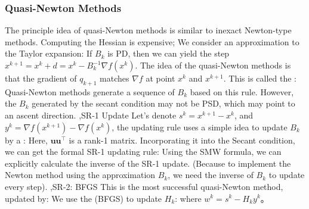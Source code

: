 \documentclass[10pt]{report}
\begin{document}
\subsubsection{Quasi-Newton Methods}
The principle idea of quasi-Newton methods is similar to inexact Newton-type methods. Computing the Hessian is expensive; We consider an approximation
to the Taylor expansion:
If $B_k$ is PD, then we can yield the step $x^{k+1}=x^k+d=x^k-B_k^{-1}\nabla f(x^k)$. The idea of the quasi-Newton methods is that the gradient of $q_{k+1}$ matches
$\nabla f$ at point $x^k$ and $x^{k+1}$. This is called the :
Quasi-Newton methods generate a sequence of $B_k$ based on this rule. However, the $B_k$ generated by the secant condition may not be PSD, which may point to an ascent direction.
\sep{SR-1 Update}
Let's denote $s^k=x^{k+1}-x^k$, and $y^k=\nabla f(x^{k+1})-\nabla f(x^k)$, the  updating rule uses a simple idea to update $B_k$ by a :
Here, $\boldsymbol{u}\boldsymbol{u}^\top$ is a rank-1 matrix. Incorporating it into the Secant condition, we can get the formal SR-1 updating rule:
Using the SMW formula, we can explicitly calculate the inverse of the SR-1 update. (Because to implement the Newton method using the approximation $B_k$, we need the inverse of $B_k$ to update every step).
\sep{SR-2: BFGS}
This is the most successful quasi-Newton method, updated by:
We use the  (BFGS) to update $H_k$:
where $w^k=s^k-H_ky^k$。
\end{document}
